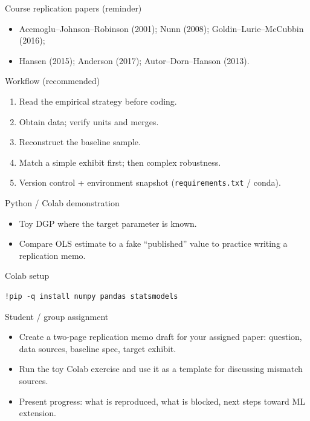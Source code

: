 \documentclass[aspectratio=169,11pt]{beamer}
\begin{document}
\begin{frame}{Course replication papers (reminder)}
  \begin{itemize}
    \item Acemoglu--Johnson--Robinson (2001); Nunn (2008); Goldin--Lurie--McCubbin (2016);
    \item Hansen (2015); Anderson (2017); Autor--Dorn--Hanson (2013).
  \end{itemize}
\end{frame}

\begin{frame}{Workflow (recommended)}
  \begin{enumerate}
    \item Read the empirical strategy before coding.
    \item Obtain data; verify units and merges.
    \item Reconstruct the baseline sample.
    \item Match a simple exhibit first; then complex robustness.
    \item Version control + environment snapshot (\texttt{requirements.txt} / conda).
  \end{enumerate}
\end{frame}

\begin{frame}{Python / Colab demonstration}
  \begin{itemize}
    \item Toy DGP where the target parameter is known.
    \item Compare OLS estimate to a fake ``published'' value to practice writing a replication memo.
  \end{itemize}
\end{frame}

\begin{frame}[fragile]{Colab setup}
  \begin{verbatim}
!pip -q install numpy pandas statsmodels
  \end{verbatim}
\end{frame}

\begin{frame}{Student / group assignment}
  \begin{itemize}
    \item Create a two-page replication memo draft for your assigned paper: question, data sources, baseline spec, target exhibit.
    \item Run the toy Colab exercise and use it as a template for discussing mismatch sources.
    \item Present progress: what is reproduced, what is blocked, next steps toward ML extension.
  \end{itemize}
\end{frame}
\end{document}
